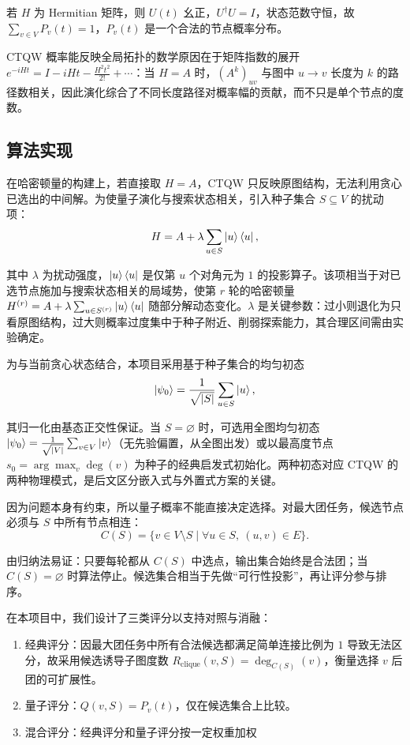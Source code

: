 \documentclass[pre,twocolumn]{revtex4-2}
\begin{document}
若 $H$ 为 Hermitian 矩阵，则 $U(t)$ 幺正，$U^\dagger U=I$，状态范数守恒，故 $\sum_{v\in V}P_v(t)=1$，$P_v(t)$ 是一个合法的节点概率分布。

CTQW 概率能反映全局拓扑的数学原因在于矩阵指数的展开 $e^{-iHt}=I-iHt-\tfrac{H^2t^2}{2!}+\cdots$：当 $H=A$ 时，$(A^k)_{uv}$ 与图中 $u\to v$ 长度为 $k$ 的路径数相关，因此演化综合了不同长度路径对概率幅的贡献，而不只是单个节点的度数。

\subsection{算法实现}
在哈密顿量的构建上，若直接取 $H=A$，CTQW 只反映原图结构，无法利用贪心已选出的中间解。为使量子演化与搜索状态相关，引入种子集合 $S\subseteq V$ 的扰动项：
\begin{equation}
H=A+\lambda\sum_{u\in S}\ket{u}\bra{u},
\label{eq:ham}
\end{equation}

其中 $\lambda$ 为扰动强度，$\ket{u}\bra{u}$ 是仅第 $u$ 个对角元为 $1$ 的投影算子。该项相当于对已选节点施加与搜索状态相关的局域势，使第 $r$ 轮的哈密顿量 $H^{(r)}=A+\lambda\sum_{u\in S^{(r)}}\ket{u}\bra{u}$ 随部分解动态变化。$\lambda$ 是关键参数：过小则退化为只看原图结构，过大则概率过度集中于种子附近、削弱探索能力，其合理区间需由实验确定。

为与当前贪心状态结合，本项目采用基于种子集合的均匀初态
\begin{equation}
\ket{\psi_0}=\frac{1}{\sqrt{|S|}}\sum_{u\in S}\ket{u},
\end{equation}

其归一化由基态正交性保证。当 $S=\varnothing$ 时，可选用全图均匀初态 $\ket{\psi_0}=\frac{1}{\sqrt{|V|}}\sum_{v\in V}\ket{v}$（无先验偏置，从全图出发）或以最高度节点 $s_0=\arg\max_v\deg(v)$ 为种子的经典启发式初始化。两种初态对应 CTQW 的两种物理模式，是后文区分嵌入式与外置式方案的关键。

因为问题本身有约束，所以量子概率不能直接决定选择。对最大团任务，候选节点必须与 $S$ 中所有节点相连：
\begin{equation}
C(S)=\{v\in V\setminus S\mid \forall u\in S,\ (u,v)\in E\}.
\end{equation}

由归纳法易证：只要每轮都从 $C(S)$ 中选点，输出集合始终是合法团；当 $C(S)=\varnothing$ 时算法停止。候选集合相当于先做“可行性投影”，再让评分参与排序。

在本项目中，我们设计了三类评分以支持对照与消融：
\begin{enumerate}
    \item 经典评分：因最大团任务中所有合法候选都满足简单连接比例为 $1$ 导致无法区分，故采用候选诱导子图度数 $R_{\mathrm{clique}}(v,S)=\deg_{C(S)}(v)$，衡量选择 $v$ 后团的可扩展性。
    \item 量子评分：$Q(v,S)=P_v(t)$，仅在候选集合上比较。
    \item 混合评分：经典评分和量子评分按一定权重加权
\end{enumerate}
\end{document}
